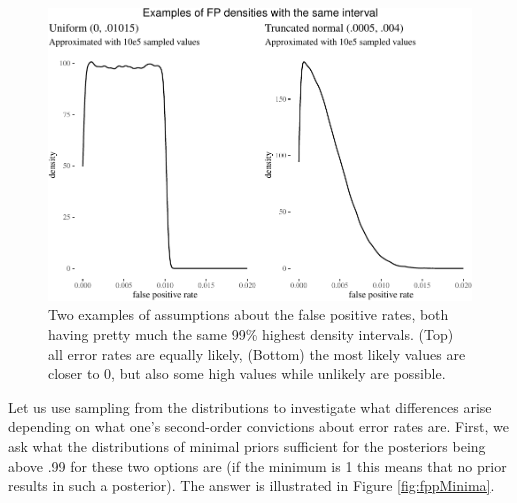 \documentclass[
  10pt,
  dvipsnames,enabledeprecatedfontcommands]{scrartcl}
\begin{document}
\begin{figure}[H]



\begin{center}\includegraphics[width=0.8\linewidth]{chapter-outline_files/figure-latex/fig:fppdistros-1} \end{center}


\caption{Two examples of assumptions about the false positive rates, both having pretty much the same 99\% highest density intervals. (Top) all error rates are equally likely, (Bottom) the most likely values are closer to 0, but also some high values while unlikely are possible.}

\label{fig:fppdistros}

\end{figure}

Let us use sampling from the distributions to investigate what
differences arise depending on what one's second-order convictions about
error rates are. First, we ask what the distributions of minimal priors
sufficient for the posteriors being above .99 for these two options are
(if the minimum is 1 this means that no prior results in such a
posterior). The answer is illustrated in Figure \ref{fig:fppMinima}.
\end{document}

